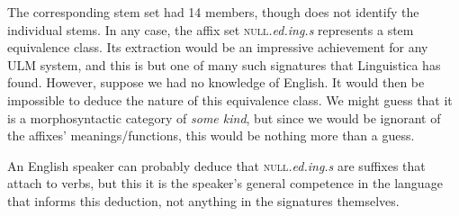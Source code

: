 The corresponding stem set had 14 members, though \cite{goldsmith:2001} 
does not identify the individual stems. 
In any case, the affix set \textsc{null}\textit{.ed.ing.s} represents 
a stem equivalence class. Its extraction would be an impressive achievement for any \ac{ULM}  system, and this
is but one of many such signatures that Linguistica has found. However, 
suppose we had no knowledge of English. It would then be impossible to deduce the nature 
of this equivalence class. We might
guess that it is a morphosyntactic category of \emph{some kind}, but since we would be ignorant
of the affixes' meanings/functions, this would be nothing more than a guess. 

An English speaker can probably deduce that \textsc{null}\textit{.ed.ing.s} are suffixes that attach to verbs,
but this it is the speaker's general competence in the language that informs this deduction, not anything in the 
signatures themselves. 

